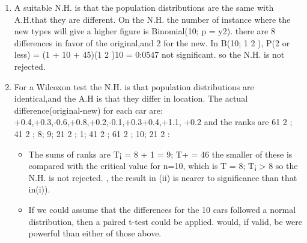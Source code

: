 \documentclass[a4paper,12pt]{article}
\begin{document}
\begin{enumerate}
\item A suitable N.H. is that the population distributions are the same with A.H.that
they are different. On the N.H. the number of instance where the new types will give a
higher figure is Binomial(10; p = y2).
there are 8 differences in favor of the original,and 2 for the new.
In B(10; 1
2 ), P(2 or less) = (1 + 10 + 45)(1
2 )10 = 0:0547 not significant. so the N.H. is
not rejected.

\item For a Wilcoxon test the N.H. is that population distributions are identical,and
the A.H is that they differ in location.
The actual difference(original-new) for each car are: +0.4,+0.3,-0.6,+0.8,+0.2,-0.1,+0.3+0.4,+1.1,
+0.2 and the ranks are 61
2 ; 41
2 ; 8; 9; 21
2 ; 1; 41
2 ; 61
2 ; 10; 21
2 : 

\begin{itemize}
    \item The sums of ranks are T¡ =
8 + 1 = 9; T+ = 46 the smaller of these is compared with the critical value for n=10,
which is T = 8; T¡ > 8 so the N.H. is not rejected.
\itemHowever, the result in (ii) is nearer to significance than that in(i)).
\item If we could assume that the differences for the 10 cars followed a normal distribution,
then a paired t-test could be applied.  \itemIt would, if valid, be were powerful than either of
those above.  
\end{itemize}
\end{enumerate}
\end{document}
